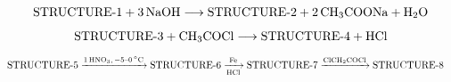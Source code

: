 \documentclass{article}
\begin{document}
\[
  \text{STRUCTURE-1} + 3\,\ce{NaOH}
  \longrightarrow
  \text{STRUCTURE-2} + 2\,\ce{CH3COONa} + \ce{H2O}
\]

\[
  \text{STRUCTURE-3} + \ce{CH3COCl}
  \longrightarrow
  \text{STRUCTURE-4} + \ce{HCl}
\]

\[
\begin{aligned}
  &\text{STRUCTURE-5}
    \xrightarrow{1\,\ce{HNO3},\, -5\text{--}0\,^\circ\mathrm{C}}
    \text{STRUCTURE-6}
    \xrightarrow[\ce{HCl}]{\mathrm{Fe}}
    \text{STRUCTURE-7}
    \xrightarrow{\ce{ClCH2COCl}}
    \text{STRUCTURE-8}
\end{aligned}
\]
\end{document}
